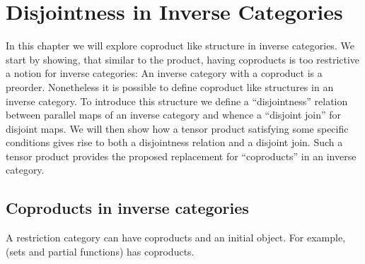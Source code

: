 \chapter{Disjointness in Inverse Categories} %
\label{cha:disjointness_in_inverse_categories}

In this chapter we will explore coproduct like structure in inverse categories. We start by showing,
that similar to the product, having coproducts is too restrictive a notion for inverse categories: An
inverse category with a coproduct is a preorder.
Nonetheless it is possible to define coproduct like structures in an inverse category. To introduce
this structure we define a ``disjointness'' relation between parallel maps of an inverse category
and whence a ``disjoint join'' for disjoint maps. We will then show how a tensor product satisfying
some specific conditions gives rise to both a disjointness relation and a disjoint join. Such a
tensor product provides the proposed replacement for ``coproducts'' in an inverse category.



\section{Coproducts in inverse categories} %
\label{sec:coproducts_in_inverse_categories}

A restriction category can have coproducts and an initial object. For example, \Par (sets and
partial functions) has coproducts.

